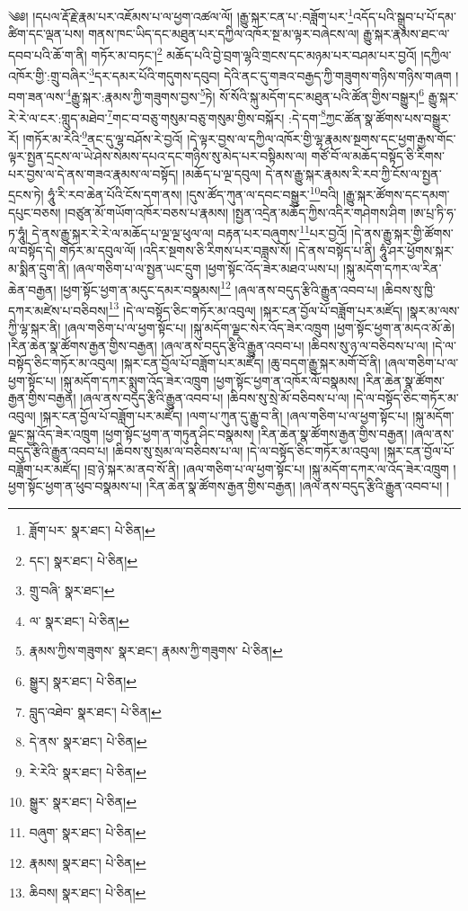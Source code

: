 \setcounter{footnote}{0} 
༄༅། །དཔལ་རྡོ་རྗེ་རྣམ་པར་འཇོམས་པ་ལ་ཕྱག་འཚལ་ལོ། །རྒྱུ་སྐར་ངན་པ་:བཟློག་པར་\footnote{ཟློག་པར་  སྣར་ཐང་།  པེ་ཅིན། }འདོད་པའི་སྒྲུབ་པ་པོ་དམ་ཚིག་དང་ལྡན་པས། གནས་ཁང་ཡིད་དང་མཐུན་པར་དཀྱིལ་འཁོར་སྔ་མ་ལྟར་བཞེངས་ལ། རྒྱུ་སྐར་རྣམས་ཐང་ལ་དབབ་པའི་ཆོ་ག་ནི། གཏོར་མ་བཏང་།\footnote{དང་།  སྣར་ཐང་།  པེ་ཅིན། } མཆོད་པའི་བྱེ་བྲག་ལྷའི་གྲངས་དང་མཉམ་པར་བཤམ་པར་བྱའོ། །དཀྱིལ་འཁོར་གྱི་:གྲུ་བཞིར་\footnote{གྲུ་བཞི་  སྣར་ཐང་། }དར་དམར་པོའི་གདུགས་དབུབ། དེའི་ནང་དུ་གཟའ་བརྒྱད་ཀྱི་གཟུགས་གཉིས་གཉིས་གཞག །བག་ཟན་ལས་\footnote{ལ་  སྣར་ཐང་།  པེ་ཅིན། }རྒྱུ་སྐར་:རྣམས་ཀྱི་གཟུགས་བྱས་\footnote{རྣམས་ཀྱིས་གཟུགས་  སྣར་ཐང་། རྣམས་ཀྱི་གཟུགས་  པེ་ཅིན། }ཏེ། སོ་སོའི་སྐུ་མདོག་དང་མཐུན་པའི་ཚོན་གྱིས་བསྒྱུར།\footnote{སྒྱུར།  སྣར་ཐང་།  པེ་ཅིན། } རྒྱུ་སྐར་རེ་རེ་ལ་ངར་:གླུད་མཐེབ་\footnote{བླུད་འཐེབ་  སྣར་ཐང་།  པེ་ཅིན། }གང་བ་བཅུ་གསུམ་བཅུ་གསུམ་གྱིས་བསྐོར། :དེ་དག་\footnote{དེ་ནས་  སྣར་ཐང་།  པེ་ཅིན། }ཀྱང་ཚོན་སྣ་ཚོགས་པས་བསྒྱུར་རོ། །གཏོར་མ་རེའི་\footnote{རེ་རེའི་  སྣར་ཐང་།  པེ་ཅིན། }ནང་དུ་ལྷ་བཤོས་རེ་བྱའོ། །དེ་ལྟར་བྱས་ལ་དཀྱིལ་འཁོར་གྱི་ལྷ་རྣམས་སྔགས་དང་ཕྱག་རྒྱས་གོང་ལྟར་སྤྱན་དྲངས་ལ་ཡེ་ཤེས་སེམས་དཔའ་དང་གཉིས་སུ་མེད་པར་བསྟིམས་ལ། གཙོ་བོ་ལ་མཆོད་བསྟོད་ཅི་རིགས་པར་བྱས་ལ་དེ་ནས་གཟའ་རྣམས་ལ་བསྟོད། །མཆོད་པ་ལྔ་དབུལ། དེ་ནས་རྒྱུ་སྐར་རྣམས་རི་རབ་ཀྱི་ངོས་ལ་སྤྱན་དྲངས་ཏེ། ཧཱུཾ་རི་རབ་ཆེན་པོའི་ངོས་དག་ནས། །དུས་ཚོད་ཀུན་ལ་དབང་བསྒྱུར་\footnote{སྒྱུར་  སྣར་ཐང་།  པེ་ཅིན། }བའི། །རྒྱུ་སྐར་ཚོགས་དང་དམག་དཔུང་བཅས། །བཙུན་མོ་གཡོག་འཁོར་བཅས་པ་རྣམས། །སྤྱན་འདྲེན་མཆོད་ཀྱིས་འདིར་གཤེགས་ཤིག །ཨ་པྲ་ཏི་ཧ་ཏ་ཧཱུཾ། དེ་ནས་རྒྱུ་སྐར་རེ་རེ་ལ་མཆོད་པ་ལྔ་ལྔ་ཕུལ་ལ། བརྟན་པར་བཞུགས་\footnote{བཞུག་  སྣར་ཐང་།  པེ་ཅིན། }པར་བྱའོ། །དེ་ནས་རྒྱུ་སྐར་གྱི་ཚོགས་ལ་བསྟོད་དེ། གཏོར་མ་དབུལ་ལོ། །འདིར་སྔགས་ཅི་རིགས་པར་བཟླས་སོ། །དེ་ནས་བསྟོད་པ་ནི། ཧཱུཾ་ཤར་ཕྱོགས་སྐར་མ་སྨིན་དྲུག་ནི། །ཞལ་གཅིག་པ་ལ་སྤྱན་ཡང་དྲུག །ཕྱག་སྟོང་འོད་ཟེར་མཐའ་ཡས་པ། །སྐུ་མདོག་དཀར་ལ་རིན་ཆེན་བརྒྱན། །ཕྱག་སྟོང་ཕྱག་ན་མདུང་དམར་བསྣམས།\footnote{རྣམས།  སྣར་ཐང་།  པེ་ཅིན། } །ཞལ་ནས་བདུད་རྩིའི་རྒྱུན་འབབ་པ། །ཆིབས་སུ་ཁྱི་དཀར་མཛེས་པ་བཅིབས།\footnote{ཆིབས།  སྣར་ཐང་།  པེ་ཅིན། } །དེ་ལ་བསྟོད་ཅིང་གཏོར་མ་འབུལ། །སྐར་ངན་བྱོལ་པོ་བཟློག་པར་མཛོད། །སྣར་མ་ལས་ཀྱི་ལྷ་སྐར་ནི། །ཞལ་གཅིག་པ་ལ་ཕྱག་སྟོང་པ། །སྐུ་མདོག་ལྗང་སེར་འོད་ཟེར་འཁྲུག །ཕྱག་སྟོང་ཕྱག་ན་མདའ་མོ་ཆེ། །རིན་ཆེན་སྣ་ཚོགས་རྒྱན་གྱིས་བརྒྱན། །ཞལ་ནས་བདུད་རྩིའི་རྒྱུན་འབབ་པ། །ཆིབས་སུ་ཉ་ལ་བཅིབས་པ་ལ། །དེ་ལ་བསྟོད་ཅིང་གཏོར་མ་འབུལ། །སྐར་ངན་བྱོལ་པོ་བཟློག་པར་མཛོད། །ཆུ་བདག་རྒྱུ་སྐར་མགོ་བོ་ནི། །ཞལ་གཅིག་པ་ལ་ཕྱག་སྟོང་པ། །སྐུ་མདོག་དཀར་སྨུག་འོད་ཟེར་འཁྲུག །ཕྱག་སྟོང་ཕྱག་ན་འཁོར་ལོ་བསྣམས། །རིན་ཆེན་སྣ་ཚོགས་རྒྱན་གྱིས་བརྒྱན། །ཞལ་ནས་བདུད་རྩིའི་རྒྱུན་འབབ་པ། །ཆིབས་སུ་སྲེ་མོ་བཅིབས་པ་ལ། །དེ་ལ་བསྟོད་ཅིང་གཏོར་མ་འབུལ། །སྐར་ངན་བྱོལ་པོ་བཟློག་པར་མཛོད། །ལག་པ་ཀུན་དུ་རྒྱུ་བ་ནི། །ཞལ་གཅིག་པ་ལ་ཕྱག་སྟོང་པ། །སྐུ་མདོག་ལྗང་སྐྱ་འོད་ཟེར་འཁྲུག །ཕྱག་སྟོང་ཕྱག་ན་གཏུན་ཤིང་བསྣམས། །རིན་ཆེན་སྣ་ཚོགས་རྒྱན་གྱིས་བརྒྱན། །ཞལ་ནས་བདུད་རྩིའི་རྒྱུན་འབབ་པ། །ཆིབས་སུ་སྲམ་ལ་བཅིབས་པ་ལ། །དེ་ལ་བསྟོད་ཅིང་གཏོར་མ་འབུལ། །སྐར་ངན་བྱོལ་པོ་བཟློག་པར་མཛོད། །བྲ་ཉེ་སྐར་མ་ནབ་སོ་ནི། །ཞལ་གཅིག་པ་ལ་ཕྱག་སྟོང་པ། །སྐུ་མདོག་དཀར་ལ་འོད་ཟེར་འཁྲུག །ཕྱག་སྟོང་ཕྱག་ན་ཕུབ་བསྣམས་པ། །རིན་ཆེན་སྣ་ཚོགས་རྒྱན་གྱིས་བརྒྱན། །ཞལ་ནས་བདུད་རྩིའི་རྒྱུན་འབབ་པ། །
